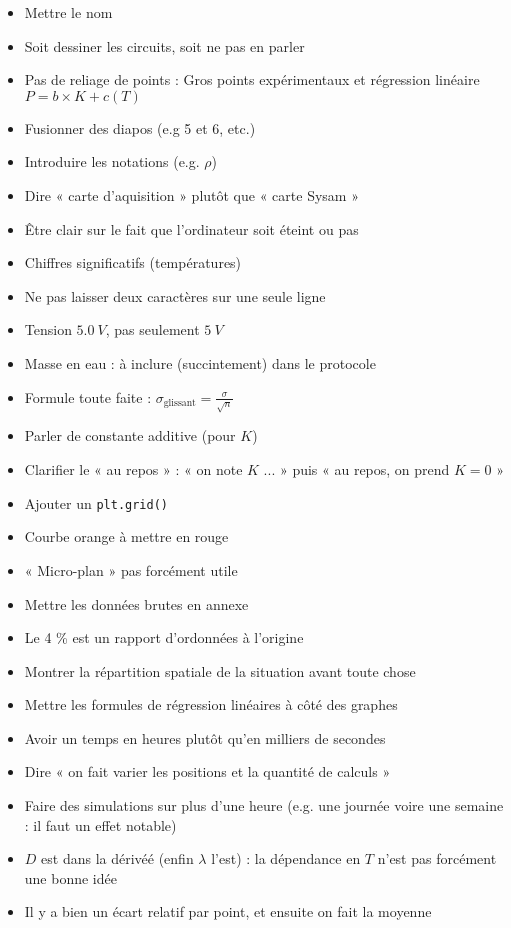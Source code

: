\documentclass{article}
\begin{document}
\begin{itemize}
    \item Mettre le nom
    \item Soit dessiner les circuits, soit ne pas en parler
    \item Pas de reliage de points : Gros points expérimentaux et régression linéaire $P = b \times K + c(T)$
    \item Fusionner des diapos (e.g 5 et 6, etc.)
    \item Introduire les notations (e.g. $\rho$)
    \item Dire « carte d'aquisition » plutôt que « carte Sysam »
    \item Être clair sur le fait que l'ordinateur soit éteint ou pas
    \item Chiffres significatifs (températures)
    \item Ne pas laisser deux caractères sur une seule ligne
    \item Tension $\SI{5,0}{V}$, pas seulement $\SI{5}{V}$
    \item Masse en eau : à inclure (succintement) dans le protocole
    \item Formule toute faite : $\sigma_\text{glissant} = \frac{\sigma}{\sqrt{n}}$
    \item Parler de constante additive (pour $K$)
    \item Clarifier le « au repos » : « on note $K$ ... » puis « au repos, on prend $K = 0$ »
    \item Ajouter un \texttt{plt.grid()}
    \item Courbe orange à mettre en rouge
    \item « Micro-plan » pas forcément utile
    \item Mettre les données brutes en annexe
    \item Le 4 \% est un rapport d'ordonnées à l'origine
    \item Montrer la répartition spatiale de la situation avant toute chose
    \item Mettre les formules de régression linéaires à côté des graphes
    \item Avoir un temps en heures plutôt qu'en milliers de secondes
    \item Dire « on fait varier les positions et la quantité de calculs »
    \item Faire des simulations sur plus d'une heure (e.g. une journée voire une semaine : il faut un effet notable)
    \item $D$ est dans la dérivéé (enfin $\lambda$ l'est) : la dépendance en $T$ n'est pas forcément une bonne idée
    \item Il y a bien un écart relatif par point, et ensuite on fait la moyenne
\end{itemize}
\end{document}
